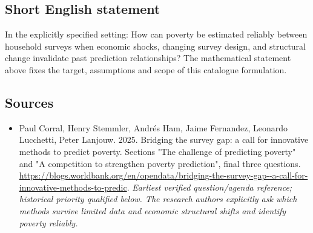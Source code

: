 \documentclass[11pt]{article}
\begin{document}
\subsection{Short English statement}
In the explicitly specified setting: How can poverty be estimated reliably between household surveys when economic shocks, changing survey design, and structural change invalidate past prediction relationships? The mathematical statement above fixes the target, assumptions and scope of this catalogue formulation.

\subsection{Sources}
\begin{itemize}\raggedright
\item[\textnormal{[S1]}]\hypertarget{source:30007661:1}{} Paul Corral, Henry Stemmler, Andrés Ham, Jaime Fernandez, Leonardo Lucchetti, Peter Lanjouw. 2025. Bridging the survey gap: a call for innovative methods to predict poverty. Sections "The challenge of predicting poverty" and "A competition to strengthen poverty prediction", final three questions.
\url{https://blogs.worldbank.org/en/opendata/bridging-the-survey-gap--a-call-for-innovative-methods-to-predic}.
{\small\textit{Earliest verified question/agenda reference; historical priority qualified below. The research authors explicitly ask which methods survive limited data and economic structural shifts and identify poverty reliably.}}
\end{itemize}
\end{document}
